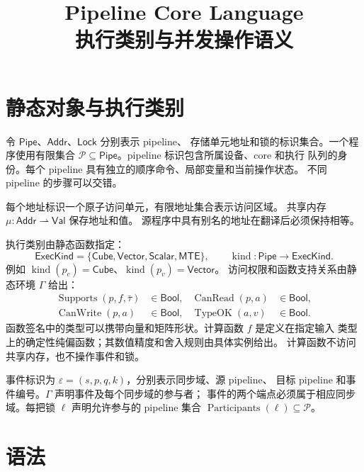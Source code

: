 \documentclass[UTF8,a4paper,11pt,fontset=fandol]{ctexart}
\title{Pipeline Core Language\\[0.4em]\large 执行类别与并发操作语义}
\author{}
\date{}
\newcommand{\kind}{\operatorname{kind}}
\begin{document}
\maketitle
\vspace{-2em}

\section{静态对象与执行类别}

令 $\mathsf{Pipe}$、$\mathsf{Addr}$、$\mathsf{Lock}$ 分别表示 pipeline、
存储单元地址和锁的标识集合。一个程序使用有限集合
$\mathcal P\subseteq\mathsf{Pipe}$。pipeline 标识包含所属设备、core 和执行
队列的身份。每个 pipeline 具有独立的顺序命令、局部变量和当前操作状态。
不同 pipeline 的步骤可以交错。

每个地址标识一个原子访问单元，有限地址集合表示访问区域。
共享内存 $\mu:\mathsf{Addr}\rightharpoonup\mathsf{Val}$ 保存地址和值。
源程序中具有别名的地址在翻译后必须保持相等。

执行类别由静态函数指定：
\[
\mathsf{ExecKind}=\{\mathsf{Cube},\mathsf{Vector},\mathsf{Scalar},\mathsf{MTE}\},
\qquad \kind:\mathsf{Pipe}\to\mathsf{ExecKind}.
\]
例如 $\kind(p_c)=\mathsf{Cube}$、$\kind(p_v)=\mathsf{Vector}$。
访问权限和函数支持关系由静态环境 $\Gamma$ 给出：
\[
\begin{aligned}
\operatorname{Supports}(p,f,\bar\tau)&\in\mathsf{Bool},&
\operatorname{CanRead}(p,a)&\in\mathsf{Bool},\\
\operatorname{CanWrite}(p,a)&\in\mathsf{Bool},&
\operatorname{TypeOK}(a,v)&\in\mathsf{Bool}.
\end{aligned}
\]
函数签名中的类型可以携带向量和矩阵形状。计算函数 $f$ 是定义在指定输入
类型上的确定性纯偏函数；其数值精度和舍入规则由具体实例给出。
计算函数不访问共享内存，也不操作事件和锁。

事件标识为 $\varepsilon=(s,p,q,k)$，分别表示同步域、源 pipeline、
目标 pipeline 和事件编号。$\Gamma$ 声明事件及每个同步域的参与者；
事件的两个端点必须属于相应同步域。每把锁 $\ell$ 声明允许参与的
pipeline 集合 $\operatorname{Participants}(\ell)\subseteq\mathcal P$。

\section{语法}
\end{document}
